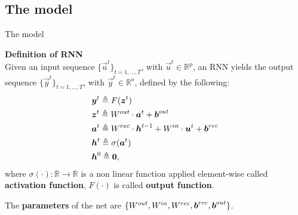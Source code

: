 
\subsection{The model}
\begin{frame}{The model}
	
\textbf{Definition of RNN}
\\
	Given an input sequence $\{\vec{u}^t\}_{t=1,...,T}$, with $ \vec{u}^t \in \mathbb{R}^p$, an RNN yields the output sequence $\{\vec{y}^t\}_{t=1,...,T}$, with $\vec{y}^t \in \mathbb{R}^o$,  defined by the following:
\begin{align}
		&\boldsymbol{y}^t \triangleq F(\boldsymbol{z}^t)\\
		&\boldsymbol{z}^t \triangleq W^{out}\cdot\boldsymbol{a}^t + \boldsymbol{b}^{out}\\
		&\boldsymbol{a}^t \triangleq W^{rec}\cdot\boldsymbol{h}^{t-1}+W^{in}\cdot\boldsymbol{u}^t+\boldsymbol{b}^{rec}\\
		&\boldsymbol{h}^t \triangleq  \sigma(\boldsymbol{a}^t) \\
		&\boldsymbol{h}^0 \triangleq \boldsymbol{0},
\end{align}
where $\sigma(\cdot):\mathbb{R}\rightarrow\mathbb{R}$ is a non linear function applied element-wise called \textbf{activation function}, $F(\cdot)$ is called \textbf{output function}. 

	The \textbf{parameters} of the net are $\{W^{out}, W^{in},  W^{rec}, \boldsymbol{b}^{rec}, \boldsymbol{b}^{out}\}$.
\end{frame}

